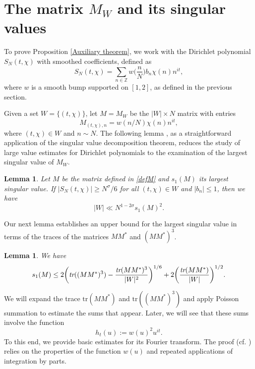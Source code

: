 \documentclass[12pt]{amsart}
\newtheorem{lemma}[theorem]{Lemma}
\theoremstyle{definition}
\theoremstyle{plain}
\theoremstyle{remark}
\numberwithin{equation}{section}
\numberwithin{theorem}{section}
\numberwithin{equation}{section}
\begin{document}
	
	\section{\texorpdfstring{The matrix $M_{W}$ and its singular values}
		{The matrix MW and its singular values}}
	\label{matrsing}
	
	To prove Proposition \ref{Auxiliary theorem}, we work with the Dirichlet polynomial $S_{N}(t, \chi)$ with smoothed coefficients, defined as
	\[ S_{N}(t, \chi)=\sum_{n \in \mathbb{Z}} w\bigg(\frac{n}{N}\bigg)b_{n}\chi(n)n^{it},
	\]
	where $w$ is a smooth bump supported on $[1, 2]$, as defined in the previous section.
	
	Given a set $W=\{(t, \chi)\}$, let $M=M_{W}$ be the $|W| \times N$ matrix with entries
	\begin{equation}\label{defM}
		M_{(t, \chi), n} = w(n/N)\chi(n)n^{it},
	\end{equation}
	where $(t, \chi) \in W$ and $n \sim N$. The following lemma \cite[Lemma 4.1]{GM}, as a straightforward application of the singular value decomposition theorem, reduces the study of large value estimates for Dirichlet polynomials to the examination of the largest singular value of $M_{W}$.
	
	\begin{lemma}\label{rtls} 
		Let $M$ be the matrix defined in \eqref{defM} and $s_{1}(M)$ its largest singular value. If $|S_{N}(t, \chi)| \geq N^{\sigma}/6$ for all $(t, \chi) \in W$ and $|b_{n}|\leq 1$, then we have
		\[ |W| \ll N^{1-2\sigma}s_{1}(M)^{2}.
		\]
	\end{lemma}
	
	Our next lemma \cite[Lemma 4.2]{GM} establishes an upper bound for the largest singular value in terms of the traces of the matrices $MM^{*}$ and $(MM^{*})^{3}$.
	\begin{lemma}\label{lsvt} 
		We have 
		$$ s_{1}(M) \leq 2\bigg( \emph{tr}((MM^{*})^{3})-\frac{ \emph{tr}(MM^{*})^{3}}{|W|^{2}}\bigg)^{1/6}+2\bigg( \frac{ \emph{tr}(MM^{*})}{|W|}\bigg)^{1/2}.
		$$
	\end{lemma}
	
	We will expand the trace $\mbox{tr}(MM^{*})$ and $\mbox{tr}((MM^{*})^{3})$ and apply Poisson summation to estimate the sums that appear. Later, we will see that these sums involve the function
	\[h_{t}(u):=w(u)^{2}u^{it}.\]
	To this end, we provide basic estimates for its Fourier transform. The proof (cf. \cite[Lemma 4.3]{GM}) relies on the properties of the function $w(u)$ and repeated applications of integration by parts.
	
\end{document}
